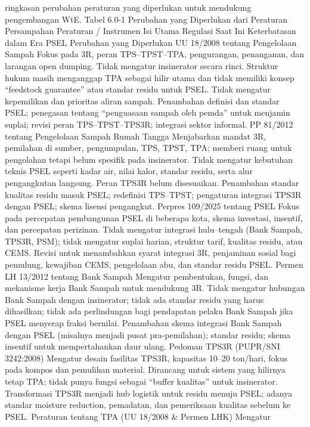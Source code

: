 \documentclass[
  letterpaper,
  DIV=11,
  numbers=noendperiod]{scrreprt}
\begin{document}
ringkasan perubahan peraturan yang diperlukan untuk mendukung
pengembangan WtE. Tabel 6.0-1 Perubahan yang Diperlukan dari Peraturan
Persampahan Peraturan / Instrumen Isi Utama Regulasi Saat Ini
Keterbatasan dalam Era PSEL Perubahan yang Diperlukan UU 18/2008 tentang
Pengelolaan Sampah Fokus pada 3R, peran TPS--TPST--TPA, pengurangan,
penanganan, dan larangan open dumping. Tidak mengatur insinerator secara
rinci. Struktur hukum masih menganggap TPA sebagai hilir utama dan tidak
memiliki konsep ``feedstock guarantee'' atau standar residu untuk PSEL.
Tidak mengatur kepemilikan dan prioritas aliran sampah. Penambahan
definisi dan standar PSEL; penegasan tentang ``penguasaan sampah oleh
pemda'' untuk menjamin suplai; revisi peran TPS--TPST--TPS3R; integrasi
sektor informal. PP 81/2012 tentang Pengelolaan Sampah Rumah Tangga
Menjabarkan mandat 3R, pemilahan di sumber, pengumpulan, TPS, TPST, TPA;
memberi ruang untuk pengolahan tetapi belum spesifik pada insinerator.
Tidak mengatur kebutuhan teknis PSEL seperti kadar air, nilai kalor,
standar residu, serta alur pengangkutan langsung. Peran TPS3R belum
disesuaikan. Penambahan standar kualitas residu masuk PSEL; redefinisi
TPS--TPST; pengaturan integrasi TPS3R dengan PSEL; skema lisensi
pengangkut. Perpres 109/2025 tentang PSEL Fokus pada percepatan
pembangunan PSEL di beberapa kota, skema investasi, insentif, dan
percepatan perizinan. Tidak mengatur integrasi hulu--tengah (Bank
Sampah, TPS3R, PSM); tidak mengatur suplai harian, struktur tarif,
kualitas residu, atau CEMS. Revisi untuk menambahkan syarat integrasi
3R, penjaminan sosial bagi pemulung, kewajiban CEMS, pengelolaan abu,
dan standar residu PSEL. Permen LH 13/2012 tentang Bank Sampah Mengatur
pembentukan, fungsi, dan mekanisme kerja Bank Sampah untuk mendukung 3R.
Tidak mengatur hubungan Bank Sampah dengan insinerator; tidak ada
standar residu yang harus dihasilkan; tidak ada perlindungan bagi
pendapatan pelaku Bank Sampah jika PSEL menyerap fraksi bernilai.
Penambahan skema integrasi Bank Sampah dengan PSEL (misalnya menjadi
pusat pra-pemilahan); standar residu; skema insentif untuk
mempertahankan daur ulang. Pedoman TPS3R (PUPR/SNI 3242:2008) Mengatur
desain fasilitas TPS3R, kapasitas 10--20 ton/hari, fokus pada kompos dan
pemulihan material. Dirancang untuk sistem yang hilirnya tetap TPA;
tidak punya fungsi sebagai ``buffer kualitas'' untuk insinerator.
Transformasi TPS3R menjadi hub logistik untuk residu menuju PSEL; adanya
standar moisture reduction, pemadatan, dan pemeriksaan kualitas sebelum
ke PSEL. Peraturan tentang TPA (UU 18/2008 \& Permen LHK) Mengatur
\end{document}
